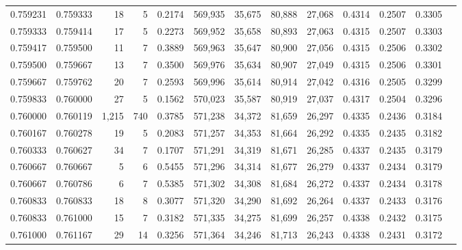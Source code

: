 \begin{tabular}{rrrrrrrrrrrrr}
0.759231 & 0.759333 &    18 &   5 &                                     0.2174 & 569,935 &  35,675 &  80,888 &  27,068 & 0.4314 & 0.2507 & 0.3305 \\
0.759333 & 0.759414 &    17 &   5 &                                     0.2273 & 569,952 &  35,658 &  80,893 &  27,063 & 0.4315 & 0.2507 & 0.3303 \\
0.759417 & 0.759500 &    11 &   7 &                                     0.3889 & 569,963 &  35,647 &  80,900 &  27,056 & 0.4315 & 0.2506 & 0.3302 \\
0.759500 & 0.759667 &    13 &   7 &                                     0.3500 & 569,976 &  35,634 &  80,907 &  27,049 & 0.4315 & 0.2506 & 0.3301 \\
0.759667 & 0.759762 &    20 &   7 &                                     0.2593 & 569,996 &  35,614 &  80,914 &  27,042 & 0.4316 & 0.2505 & 0.3299 \\
0.759833 & 0.760000 &    27 &   5 &                                     0.1562 & 570,023 &  35,587 &  80,919 &  27,037 & 0.4317 & 0.2504 & 0.3296 \\
0.760000 & 0.760119 & 1,215 & 740 &                                     0.3785 & 571,238 &  34,372 &  81,659 &  26,297 & 0.4335 & 0.2436 & 0.3184 \\
0.760167 & 0.760278 &    19 &   5 &                                     0.2083 & 571,257 &  34,353 &  81,664 &  26,292 & 0.4335 & 0.2435 & 0.3182 \\
0.760333 & 0.760627 &    34 &   7 &                                     0.1707 & 571,291 &  34,319 &  81,671 &  26,285 & 0.4337 & 0.2435 & 0.3179 \\
0.760667 & 0.760667 &     5 &   6 &                                     0.5455 & 571,296 &  34,314 &  81,677 &  26,279 & 0.4337 & 0.2434 & 0.3179 \\
0.760667 & 0.760786 &     6 &   7 &                                     0.5385 & 571,302 &  34,308 &  81,684 &  26,272 & 0.4337 & 0.2434 & 0.3178 \\
0.760833 & 0.760833 &    18 &   8 &                                     0.3077 & 571,320 &  34,290 &  81,692 &  26,264 & 0.4337 & 0.2433 & 0.3176 \\
0.760833 & 0.761000 &    15 &   7 &                                     0.3182 & 571,335 &  34,275 &  81,699 &  26,257 & 0.4338 & 0.2432 & 0.3175 \\
0.761000 & 0.761167 &    29 &  14 &                                     0.3256 & 571,364 &  34,246 &  81,713 &  26,243 & 0.4338 & 0.2431 & 0.3172 \\

\end{tabular}
